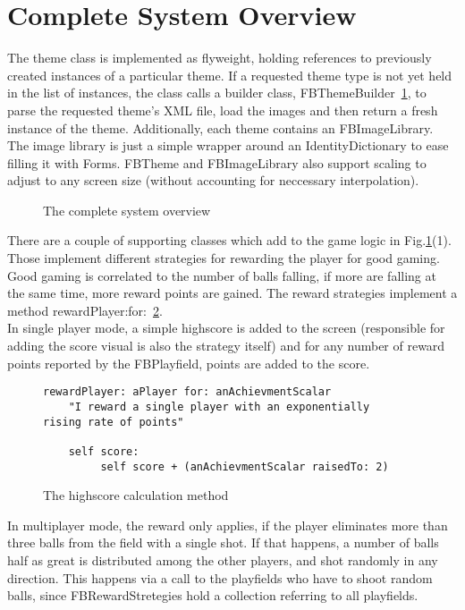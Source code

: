 \section{Complete System Overview}
%
The theme class is implemented as flyweight, holding references to previously 
created instances of a particular theme. If a requested theme type is not yet 
held in the list of instances, the class calls a builder class, 
FBThemeBuilder~\ref{fig:system}, to parse the requested theme's XML file, 
load the images and then return a fresh instance of the theme. Additionally, 
each theme contains an FBImageLibrary. The image library is just a simple 
wrapper around an IdentityDictionary to ease filling it with Forms. 
FBTheme and FBImageLibrary also support scaling to adjust to any screen 
size (without accounting for neccessary interpolation).
%
\begin{figure}[bt]
  \begin{center}
  \end{center}
  \caption{The complete system overview}
  \label{fig:system}
\end{figure}
%
There are a couple of supporting classes which add to the game logic 
in Fig.\ref{fig:system}(1). Those implement different strategies for 
rewarding the player for good gaming. Good gaming is correlated to the 
number of balls falling, if more are falling at the same time, more 
reward points are gained.
The reward strategies implement a method
rewardPlayer:for:~\ref{lst:reward}.\\
In single player mode, a
simple highscore is added to the screen (responsible for adding the 
score visual is also the strategy itself) and for any number of 
reward points reported by the FBPlayfield, points are added to the 
score. 
%
\begin{figure}
  \begin{center}
    \begin{lstlisting}
rewardPlayer: aPlayer for: anAchievmentScalar
    "I reward a single player with an exponentially 
rising rate of points" 

    self score:
         self score + (anAchievmentScalar raisedTo: 2)
    \end{lstlisting}
  \end{center}
  \caption{The highscore calculation method}
  \label{lst:reward}
\end{figure}
In multiplayer mode, the reward only applies, if the player eliminates 
more than three balls from the field with a single shot. If that happens, 
a number of balls half as great is distributed among the other players,
and shot randomly in any direction. This happens via a call to 
the playfields who have to shoot random balls, since FBRewardStretegies
hold a collection referring to all playfields.

